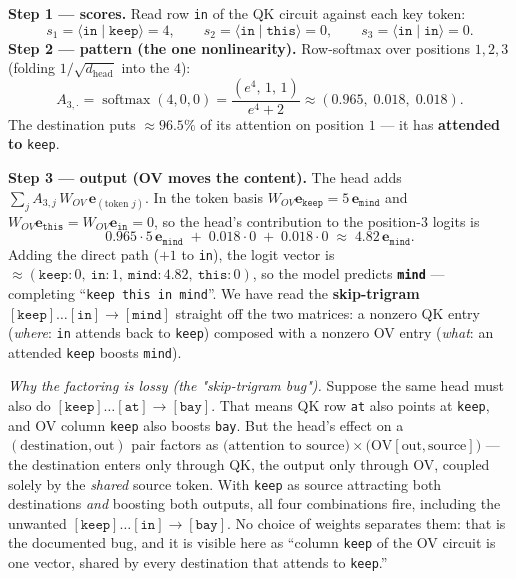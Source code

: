 \begin{callout}
\textbf{Step 1 --- scores.} Read row \texttt{in} of the QK circuit against each key token:
\[
s_1=\langle\texttt{in}\mid\texttt{keep}\rangle=4,\qquad s_2=\langle\texttt{in}\mid\texttt{this}\rangle=0,\qquad s_3=\langle\texttt{in}\mid\texttt{in}\rangle=0.
\]
\textbf{Step 2 --- pattern (the one nonlinearity).} Row-softmax over positions $1,2,3$ (folding $1/\sqrt{d_{\text{head}}}$ into the $4$):
\[
A_{3,\cdot}=\operatorname{softmax}(4,0,0)=\frac{(e^4,\,1,\,1)}{e^4+2}\approx(0.965,\;0.018,\;0.018).
\]
The destination puts $\approx\!96.5\%$ of its attention on position $1$ --- it has \textbf{attended to} \texttt{keep}.

\textbf{Step 3 --- output (OV moves the content).} The head adds $\sum_j A_{3,j}\,W_{OV}\,\mathbf e_{(\text{token }j)}$. In the token basis $W_{OV}\mathbf e_{\texttt{keep}}=5\,\mathbf e_{\texttt{mind}}$ and $W_{OV}\mathbf e_{\texttt{this}}=W_{OV}\mathbf e_{\texttt{in}}=0$, so the head's contribution to the position-$3$ logits is
\[
0.965\cdot 5\,\mathbf e_{\texttt{mind}}\;+\;0.018\cdot 0\;+\;0.018\cdot 0\;\approx\;4.82\,\mathbf e_{\texttt{mind}}.
\]
Adding the direct path ($+1$ to \texttt{in}), the logit vector is $\approx(\texttt{keep}:0,\ \texttt{in}:1,\ \texttt{mind}:4.82,\ \texttt{this}:0)$, so the model predicts \textbf{\texttt{mind}} --- completing ``\texttt{keep this in mind}''. We have read the \textbf{skip-trigram} $[\texttt{keep}]\dots[\texttt{in}]\!\to\![\texttt{mind}]$ straight off the two matrices: a nonzero QK entry (\emph{where}: \texttt{in} attends back to \texttt{keep}) composed with a nonzero OV entry (\emph{what}: an attended \texttt{keep} boosts \texttt{mind}).

\emph{Why the factoring is lossy (the "skip-trigram bug").} Suppose the same head must also do $[\texttt{keep}]\dots[\texttt{at}]\!\to\![\texttt{bay}]$. That means QK row \texttt{at} also points at \texttt{keep}, and OV column \texttt{keep} also boosts \texttt{bay}. But the head's effect on a $(\text{destination},\text{out})$ pair factors as $\big(\text{attention to source}\big)\times\big(\text{OV}[\text{out},\text{source}]\big)$ --- the destination enters only through QK, the output only through OV, coupled solely by the \emph{shared} source token. With \texttt{keep} as source attracting both destinations \emph{and} boosting both outputs, all four combinations fire, including the unwanted $[\texttt{keep}]\dots[\texttt{in}]\!\to\![\texttt{bay}]$. No choice of weights separates them: that is the documented bug, and it is visible here as ``column \texttt{keep} of the OV circuit is one vector, shared by every destination that attends to \texttt{keep}.''
\end{callout}


